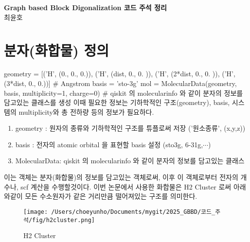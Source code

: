 \documentclass[11pt]{article}
\begin{document}
\begin{center}
  {\LARGE \bfseries Graph based Block Digonalization 코드 주석 정리} \\[10pt]
  {\large 최윤호}
\end{center}

\section{분자(화합물) 정의}
\begin{CodeBox}[title={Example: Python snippet}]
geometry = [('H', (0., 0., 0.)),
            ('H', (dist, 0., 0. )),
            ('H', (2*dist, 0., 0. )),
            ('H', (3*dist, 0., 0.))]  # Angstrom
basis = 'sto-3g'
mol = MolecularData(geometry, basis, multiplicity=1, charge=0)
# qiskit 의 molecularinfo 와 같이 분자의 정보를 담고있는 클래스를 생성 이때 필요한 정보는 기하학적인 구조(geometry), basis, 시스템의 multiplicity와 총 전하량 등의 정보가 필요하다. 
\end{CodeBox}

\begin{enumerate}[label=\textbf{*}, leftmargin=*]
  \item geometry : 원자의 종류와 기하학적인 구조를 튜플로써 저장 ('원소종류', (x,y,z))
  \item basis : 전자의 atomic orbital 을 표현할 basis 설정 (sto3g, 6-31g,$\cdots$)
  \item MolecularData: qiskit 의 molecularinfo 와 같이 분자의 정보를 담고있는 클래스
\end{enumerate}
이는 객체는 분자(화합물)의 정보를 담고있는 객체로써, 이후 이 객체로부터 전자의 개수나, scf 계산을 수행할것이다. 
이번 논문에서 사용한 화합물은 H2 Cluster 로써 아래와같이 모든 수소원자가 같은 거리만큼 떨어져있는 구조를 의미한다. 
\begin{figure}[h]
    \centering
    \texttt{[image: /Users/choeyunho/Documents/mygit/2025\_GBBD/코드\_주석/fig/h2cluster.png]}
    \caption{H2 Cluster}
    \label{fig:my_image}
\end{figure}
\end{document}
